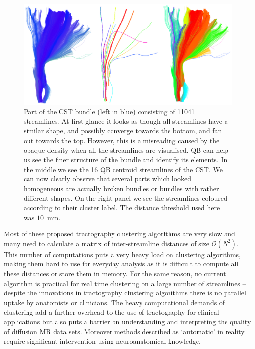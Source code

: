 \documentclass{bioinfo}
\begin{document}
%
\begin{figure}[htp]
\centerline{\includegraphics[width=160mm]{Figures/Fig_4_cst_simplification_relabeled_triple.eps}}
\caption{Part of the CST bundle (left in blue) consisting of \num{11041}
  streamlines. At first glance it looks as though all streamlines have a
  similar shape, and possibly converge towards the bottom, and fan out
  towards the top. However, this is a misreading caused by the opaque
  density when all the streamlines are visualised.  QB can help us see
  the finer structure of the bundle and identify its elements. In the
  middle we see the 16 QB centroid streamlines of the CST. We can now
  clearly observe that several parts which looked homogeneous are
  actually broken bundles or bundles with rather different shapes. On
  the right panel we see the streamlines coloured according to their
  cluster label. The distance threshold used here was
  $10$~mm. \label{Flo:cst_pbc}}
\end{figure}

Most of these proposed tractography clustering algorithms are very slow
and many need to calculate a matrix of inter-streamline distances of
size $\mathcal{O}(N^2)$.  This number of computations puts a very heavy
load on clustering algorithms, making them hard to use for everyday
analysis as it is difficult to compute all these distances or store them
in memory. For the same reason, no current algorithm is practical for
real time clustering on a large number of streamlines -- despite the
innovations in tractography clustering algorithms there is no parallel
uptake by anatomists or clinicians. The heavy computational demands of
clustering add a further overhead to the use of tractography for
clinical applications but also puts a barrier on understanding and
interpreting the quality of diffusion MR data sets. Moreover methods
described as `automatic' in reality require significant intervention
using neuroanatomical knowledge.
\end{document}
